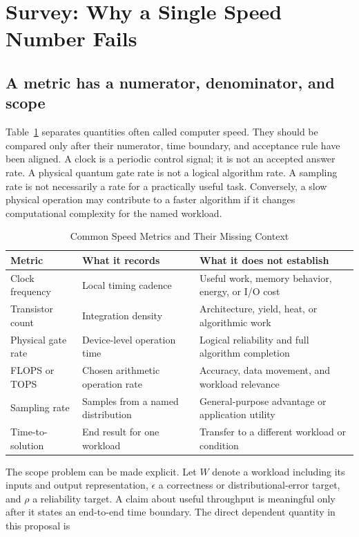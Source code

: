 \documentclass[conference]{IEEEtran}
\begin{document}
\section{Survey: Why a Single Speed Number Fails}

\subsection{A metric has a numerator, denominator, and scope}

Table~\ref{tab:metrics} separates quantities often called computer speed.
They should be compared only after their numerator, time boundary, and
acceptance rule have been aligned. A clock is a periodic control signal; it is
not an accepted answer rate. A physical quantum gate rate is not a logical
algorithm rate. A sampling rate is not necessarily a rate for a practically
useful task. Conversely, a slow physical operation may contribute to a faster
algorithm if it changes computational complexity for the named workload.

\begin{table}[t]
\caption{Common Speed Metrics and Their Missing Context}
\label{tab:metrics}
\centering
\footnotesize
\begin{tabular}{p{}p{}p{}}
\toprule
Metric & What it records & What it does not establish\\
\midrule
Clock frequency & Local timing cadence & Useful work, memory behavior, energy, or I/O cost\\
Transistor count & Integration density & Architecture, yield, heat, or algorithmic work\\
Physical gate rate & Device-level operation time & Logical reliability and full algorithm completion\\
FLOPS or TOPS & Chosen arithmetic operation rate & Accuracy, data movement, and workload relevance\\
Sampling rate & Samples from a named distribution & General-purpose advantage or application utility\\
Time-to-solution & End result for one workload & Transfer to a different workload or condition\\
\bottomrule
\end{tabular}
\end{table}

The scope problem can be made explicit. Let \(W\) denote a workload including
its inputs and output representation, \(\epsilon\) a correctness or
distributional-error target, and \(\rho\) a reliability target. A claim about
useful throughput is meaningful only after it states an end-to-end time
boundary. The direct dependent quantity in this proposal is
\end{document}
